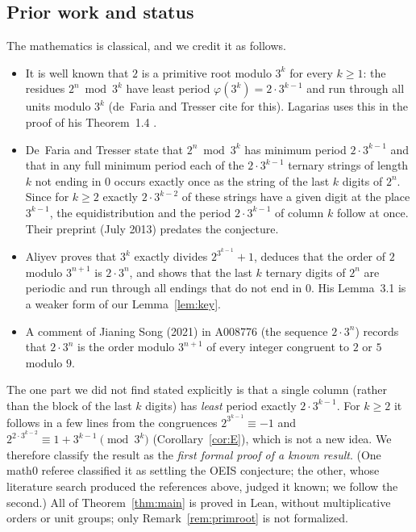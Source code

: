\documentclass[11pt]{amsart}
\theoremstyle{plain}
\theoremstyle{definition}
\begin{document}
\subsection*{Prior work and status}
The mathematics is classical, and we credit it as follows.
\begin{itemize}
\item It is well known that $2$ is a primitive root modulo $3^k$ for every $k\ge1$: the residues $2^n \bmod 3^k$ have least period $\varphi(3^k)=2\cdot3^{k-1}$ and run through all units modulo $3^k$ (de~Faria and Tresser cite \cite[p.~81]{LeV} for this). Lagarias uses this in the proof of his Theorem~1.4 \cite[eq.~(3.3)]{Lag}.
\item De~Faria and Tresser \cite[\S3.1, Lemma~3 and the paragraph following it]{dFT} state that $2^n \bmod 3^k$ has minimum period $2\cdot3^{k-1}$ and that in any full minimum period each of the $2\cdot3^{k-1}$ ternary strings of length $k$ not ending in $0$ occurs exactly once as the string of the last $k$ digits of $2^n$. Since for $k\ge2$ exactly $2\cdot3^{k-2}$ of these strings have a given digit at the place $3^{k-1}$, the equidistribution and the period $2\cdot3^{k-1}$ of column $k$ follow at once. Their preprint (July 2013) predates the conjecture.
\item Aliyev \cite[Lemmas~3.1--3.3, the Note after Lemma~3.2, and Observation~I]{Ali} proves that $3^k$ exactly divides $2^{3^{k-1}}+1$, deduces that the order of $2$ modulo $3^{n+1}$ is $2\cdot3^n$, and shows that the last $k$ ternary digits of $2^n$ are periodic and run through all endings that do not end in $0$. His Lemma~3.1 is a weaker form of our Lemma~\ref{lem:key}.
\item A comment of Jianing Song (2021) in A008776 \cite{A008776} (the sequence $2\cdot3^n$) records that $2\cdot3^n$ is the order modulo $3^{n+1}$ of every integer congruent to $2$ or $5$ modulo $9$.
\end{itemize}
The one part we did not find stated explicitly is that a single column (rather than the block of the last $k$ digits) has \emph{least} period exactly $2\cdot3^{k-1}$. For $k\ge2$ it follows in a few lines from the congruences $2^{3^{k-1}}\equiv-1$ and $2^{2\cdot3^{k-2}}\equiv 1+3^{k-1} \pmod{3^k}$ (Corollary~\ref{cor:E}), which is not a new idea. We therefore classify the result as the \emph{first formal proof of a known result}. (One math0 referee classified it as settling the OEIS conjecture; the other, whose literature search produced the references above, judged it known; we follow the second.) All of Theorem~\ref{thm:main} is proved in Lean, without multiplicative orders or unit groups; only Remark~\ref{rem:primroot} is not formalized.
\end{document}
